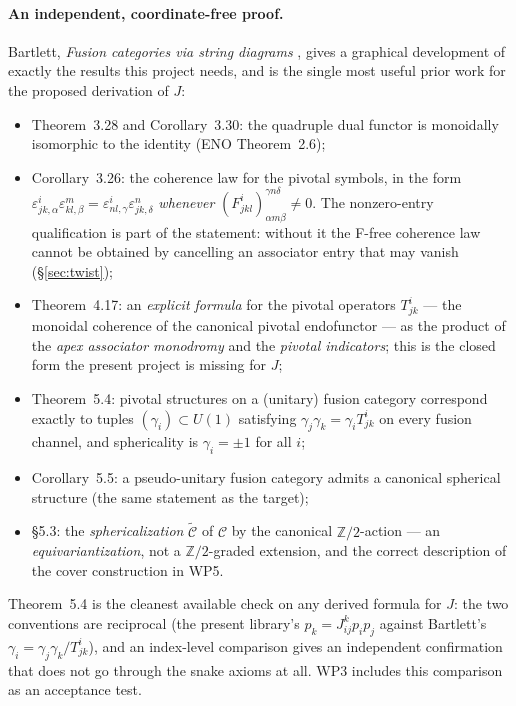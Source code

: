 \documentclass[11pt,a4paper]{article}
\theoremstyle{remark}
\newcommand{\C}{\mathcal{C}}
\newcommand{\Z}{\mathbb{Z}}
\begin{document}
\paragraph{An independent, coordinate-free proof.}
Bartlett, \emph{Fusion categories via string diagrams} \cite{Bartlett1502}, gives a graphical
development of exactly the results this project needs, and is the single most useful prior work
for the proposed derivation of $J$:
\begin{itemize}
\item Theorem~3.28 and Corollary~3.30: the quadruple dual functor is monoidally isomorphic to
the identity (ENO Theorem~2.6);
\item Corollary~3.26: the coherence law for the pivotal symbols, in the form
$\varepsilon^{i}_{jk,\alpha}\varepsilon^{m}_{kl,\beta} =
\varepsilon^{i}_{nl,\gamma}\varepsilon^{n}_{jk,\delta}$ \emph{whenever}
$(F^{i}_{jkl})^{\gamma n\delta}_{\alpha m\beta} \neq 0$. The nonzero-entry qualification is part
of the statement: without it the F-free coherence law cannot be obtained by cancelling an
associator entry that may vanish (\S\ref{sec:twist});
\item Theorem~4.17: an \emph{explicit formula} for the pivotal operators
$T^{i}_{jk}$ --- the monoidal coherence of the canonical pivotal endofunctor --- as the product
of the \emph{apex associator monodromy} and the \emph{pivotal indicators}; this is the closed
form the present project is missing for $J$;
\item Theorem~5.4: pivotal structures on a (unitary) fusion category correspond exactly to
tuples $(\gamma_i) \subset U(1)$ satisfying $\gamma_j \gamma_k = \gamma_i T^{i}_{jk}$ on every
fusion channel, and sphericality is $\gamma_i = \pm 1$ for all $i$;
\item Corollary~5.5: a pseudo-unitary fusion category admits a canonical spherical structure
(the same statement as the target);
\item \S5.3: the \emph{sphericalization} $\widetilde{\C}$ of $\C$ by the canonical $\Z/2$-action
--- an \emph{equivariantization}, not a $\Z/2$-graded extension, and the correct description of
the cover construction in WP5.
\end{itemize}
Theorem~5.4 is the cleanest available check on any derived formula for $J$: the two conventions
are reciprocal (the present library's $p_k = J^{k}_{ij} p_i p_j$ against Bartlett's
$\gamma_i = \gamma_j\gamma_k / T^{i}_{jk}$), and an index-level comparison gives an independent
confirmation that does not go through the snake axioms at all. WP3 includes this comparison as
an acceptance test.
\end{document}
